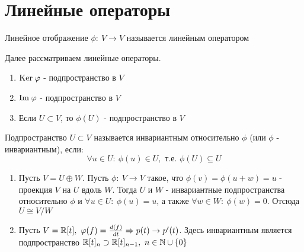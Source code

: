 \section{Линейные операторы}
    \begin{definition}
        Линейное отображение $\phi: \ V \to V$ называется линейным оператором 
    \end{definition}
    Далее рассматриваем линейные операторы.
    \begin{subtheorem} \tab
        \begin{enumerate}
            \item $\text{Ker} \hspace{0.09cm} \phi$ - подпространство в $V$
            \item $\text{Im} \hspace{0.09cm} \phi$ - подпространство в $V$
            \item Если $U \subset V$, то $\phi(U)$ - подпространство в $V$
        \end{enumerate} 
    \end{subtheorem}
    \begin{definition}
        Подпространство $U \subset V$ называется инвариантным относительно $\phi$ (или $\phi$ - инвариантным), если: 
        $$\forall u \in U: \ \phi(u) \in U, \text{ т.е. }\phi(U) \subseteq U$$   
    \end{definition} 
    \begin{example}\tab
        \begin{enumerate}
            \item Пусть $V = U \oplus W$. Пусть $\phi: \ V \to V$ такое, что $\phi(v) = \phi(u + w) = u$ - проекция $V$ на $U$ вдоль $W$. Тогда $U$ и $W$ - инвариантные подпространства относительно $\phi$ и $\forall u \in U: \ \phi(u) = u$, а также $\forall w \in W: \ \phi(w) = 0$. Отсюда $U \cong V/W$
            \item Пусть $V = \R[t], \ \phi(f) = \frac{d(f)}{dt}\Rightarrow p(t) \to p'(t)$. Здесь инвариантным является подпространство $\R[t]_n \supset \R[t]_{n-1}, \ n \in \N \cup \{0\}$               
        \end{enumerate}
    \end{example}
